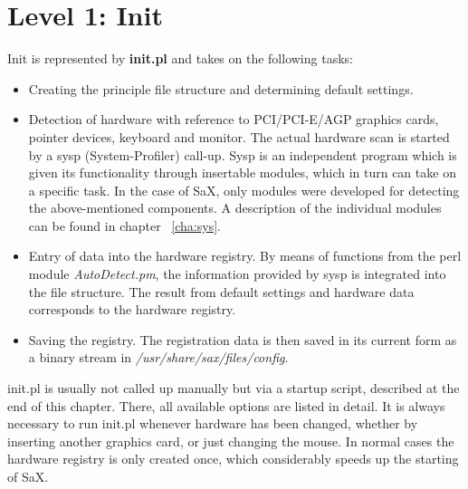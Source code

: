 \newpage

\section{Level 1: Init}
\label{sec:le1}
Init is represented by  \textbf{init.pl} and takes on the following tasks:\\
\begin{itemize}
\item Creating the principle file structure and determining default settings.
\item Detection of hardware with reference to PCI/PCI-E/AGP graphics cards,
  pointer devices, keyboard and monitor. The actual hardware scan is started
  by a sysp (System-Profiler) call-up. Sysp is an independent program which is
  given its functionality through insertable modules, which in turn can take on
  a specific task. In the case of SaX, only modules were developed for detecting
  the above-mentioned components. A description of the individual modules can
  be found in chapter ~\ref{cha:sys}.
\item Entry of data into the hardware registry. By means of functions from the
  perl module \textit{AutoDetect.pm}, the information provided by sysp is
  integrated into the file structure. The result from default settings and
  hardware data corresponds to the hardware registry.
\item Saving the registry. The registration data is then saved in its current
  form as a binary stream in \textit{/usr/share/sax/files/config}. 
\end{itemize}

init.pl is usually not called up manually but via a startup script, described
at the end of this chapter. There, all available options are listed in
detail. It is always necessary to run init.pl whenever hardware has been
changed, whether by inserting another graphics card, or just changing the
mouse. In normal cases the hardware registry is only created once, which
considerably speeds up the starting of SaX. 

